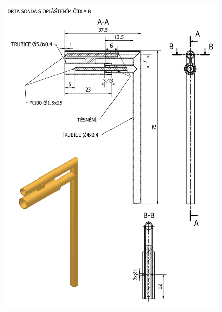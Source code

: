     \begin{figure}[ht!]
        \centering
        \includegraphics[width=\textwidth]{400_SIMULACE_KONSTRUKCNICH_UPRAV/Vykresy_rendery/Sonda_se_stinenim_B_vykres.png}
        
    \end{figure}
    \newpage
{} \label{fig:sonda-s-rozsirenym-stinenim-B-vykres}
